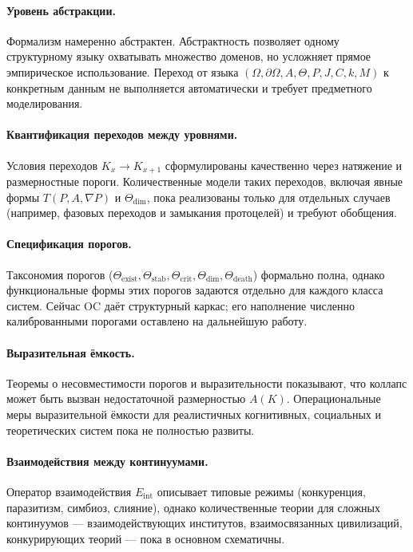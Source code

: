 \paragraph{Уровень абстракции.}
Формализм намеренно абстрактен. Абстрактность позволяет одному структурному языку
охватывать множество доменов, но усложняет прямое эмпирическое использование.
Переход от языка \((\Omega,\partial\Omega,A,\Theta,P,J,C,k,M)\) к конкретным данным
не выполняется автоматически и требует предметного моделирования.

\paragraph{Квантификация переходов между уровнями.}
Условия переходов \(K_x \to K_{x+1}\) сформулированы качественно через натяжение и
размерностные пороги.
Количественные модели таких переходов, включая явные формы \(T(P,A,\nabla P)\) и
\(\Theta_{\mathrm{dim}}\), пока реализованы только для отдельных случаев
(например, фазовых переходов и замыкания протоцелей) и требуют обобщения.

\paragraph{Спецификация порогов.}
Таксономия порогов (\(\Theta_{\mathrm{exist}}, \Theta_{\mathrm{stab}},
\Theta_{\mathrm{crit}}, \Theta_{\mathrm{dim}}, \Theta_{\mathrm{death}}\)) формально
полна, однако функциональные формы этих порогов задаются отдельно для каждого класса
систем.
Сейчас OC даёт структурный каркас; его наполнение численно калиброванными порогами
оставлено на дальнейшую работу.

\paragraph{Выразительная ёмкость.}
Теоремы о несовместимости порогов и выразительности показывают, что коллапс может
быть вызван недостаточной размерностью \(A(K)\).
Операциональные меры выразительной ёмкости для реалистичных когнитивных,
социальных и теоретических систем пока не полностью развиты.

\paragraph{Взаимодействия между континуумами.}
Оператор взаимодействия \(E_{\mathrm{int}}\) описывает типовые режимы
(конкуренция, паразитизм, симбиоз, слияние), однако количественные теории для
сложных континуумов — взаимодействующих институтов, взаимосвязанных цивилизаций,
конкурирующих теорий — пока в основном схематичны.


